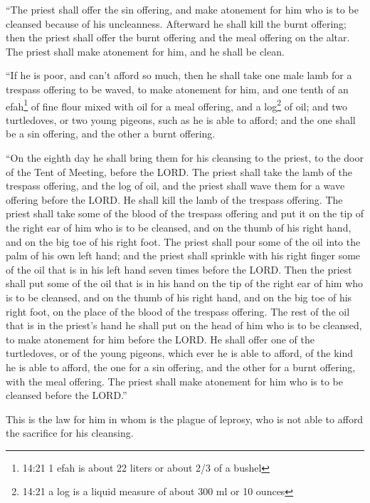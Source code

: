\myverse{}“The priest shall offer the sin offering, and make atonement
for him who is to be cleansed because of his uncleanness. Afterward he shall kill the burnt offering;
\myverse{}then the priest shall offer the burnt offering and the meal offering on the
altar. The priest shall make atonement for him, and he shall be clean.


\myverse{}“If he is poor, and can’t afford so much, then he shall take
one male lamb for a trespass offering to be waved, to make atonement for him, and one tenth of an efah\footnote{14:21 1 efah is about 22 liters or about 2/3 of a bushel} of fine flour mixed with oil for
a meal offering, and a log\footnote{14:21 a log is a liquid measure of about 300 ml or 10 ounces} of oil;
\myverse{}and two turtledoves, or two young pigeons, such as he is able to afford;
and the one shall be a sin offering, and the other a burnt offering.


\myverse{}“On the eighth day he shall bring them for his cleansing to
the priest, to the door of the Tent of Meeting, before the LORD.
\myverse{}The priest shall take the lamb of the trespass offering, and the log of oil,
and the priest shall wave them for a wave offering before the LORD.
\myverse{}He shall kill the lamb of the trespass offering. The priest shall take some
of the blood of the trespass offering and put it on the tip of the right ear of him who is to be cleansed,
and on the thumb of his right hand, and on the big toe of his right foot.
\myverse{}The priest shall pour some of the oil into the palm of his own left hand;
\myverse{}and the priest shall sprinkle with his right finger some of the oil that
is in his left hand seven times before the LORD.
\myverse{}Then the priest shall put some of the oil that is in his hand on the tip
of the right ear of him who is to be cleansed, and on the thumb of his right hand, and on the big toe
of his right foot, on the place of the blood of the trespass offering.
\myverse{}The rest of the oil that is in the priest’s hand he shall put on the head
of him who is to be cleansed, to make atonement for him before the LORD.
\myverse{}He shall offer one of the turtledoves, or of the young pigeons, which ever
he is able to afford,
\myverse{}of the kind he is able to afford, the one for a sin offering, and the other
for a burnt offering, with the meal offering. The priest shall make atonement for him who is to be cleansed
before the LORD.”


\myverse{}This is the law for him in whom is the plague of leprosy, who
is not able to afford the sacrifice for his cleansing.


